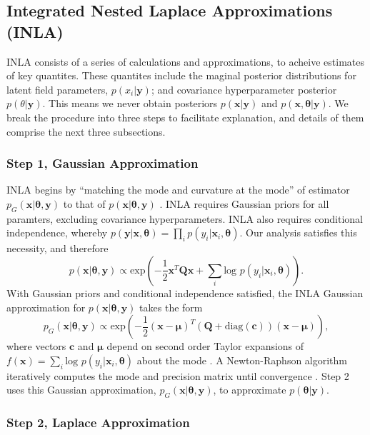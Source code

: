 \subsection{Integrated Nested Laplace Approximations (INLA)}

INLA consists of a series of calculations and approximations, to acheive estimates of key quantites. These quantites include the maginal posterior distributions for latent field parameters, $p(x_{i}|\pmb{y})$; and covariance hyperparameter posterior $p(\theta|\pmb{y})$. This means we never obtain posteriors $p(\pmb{x}|\pmb{y})$ and $p(\pmb{x},\pmb{\theta}|\pmb{y})$. We break the procedure into three steps to facilitate explanation, and details of them comprise the next three subsections.

\subsubsection{Step 1, Gaussian Approximation} %

INLA begins by ``matching the mode and curvature at the mode'' of estimator $p_{G}(\pmb{x}|\pmb{\theta}, \pmb{y})$ to that of $p(\pmb{x}|\pmb{\theta}, \pmb{y})$ \citep{Rue2005}. INLA requires Gaussian priors for all paramters, excluding covariance hyperparameters. INLA also requires conditional independence, whereby $p(\pmb{y}|\pmb{x}, \pmb{\theta}) = \prod_{i} p(y_{i}|\pmb{x}_{i},\pmb{\theta})$. Our analysis satisfies this necessity, and therefore $$p(\pmb{x}|\pmb{\theta},\pmb{y}) \propto \text{exp}\left(-\frac{1}{2}\pmb{x}^{T}\pmb{Q x} + \sum_{i} \text{log }p(y_{i}|\pmb{x}_{i},\pmb{\theta}) \right).$$ With Gaussian priors and conditional independence satisfied, the INLA Gaussian approximation for $p(\pmb{x}|\pmb{\theta}, \pmb{y})$ takes the form
$$p_{G}(\pmb{x}|\pmb{\theta},\pmb{y}) \propto \text{exp} \left( -\frac{1}{2}(\pmb{x-\mu})^{T} (\pmb{Q} + \text{diag}(\pmb{c}) ) (\pmb{x - \mu}) \right),$$
where vectors $\pmb{c}$ and $\pmb{\mu}$ depend on second order Taylor expansions of $f(\pmb{x}) = \sum_{i} \text{log }p(y_{i}|\pmb{x}_{i},\pmb{\theta})$ about the mode \citep{Lindstrom2014}. A Newton-Raphson algorithm iteratively computes the mode and precision matrix until convergence \citep{Rue2009}. Step 2 uses this Gaussian approximation, $p_{G}(\pmb{x}|\pmb{\theta},\pmb{y})$, to approximate $p(\pmb{\theta}|\pmb{y})$.

\subsubsection{Step 2, Laplace Approximation}  %

